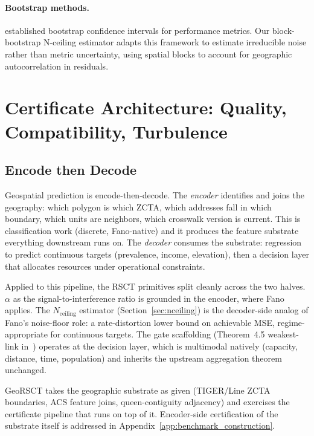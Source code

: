 \documentclass{article}
\begin{document}
\paragraph{Bootstrap methods.} \citet{efron1993bootstrap} established bootstrap confidence intervals for performance metrics. Our block-bootstrap N-ceiling estimator adapts this framework to estimate irreducible noise rather than metric uncertainty, using spatial blocks to account for geographic autocorrelation in residuals.

\section{Certificate Architecture: Quality, Compatibility, Turbulence}
\label{sec:rsn}

\subsection{Encode then Decode}

Geospatial prediction is encode-then-decode. The \emph{encoder} identifies and joins the geography: which polygon is which ZCTA, which addresses fall in which boundary, which units are neighbors, which crosswalk version is current. This is classification work (discrete, Fano-native) and it produces the feature substrate everything downstream runs on. The \emph{decoder} consumes the substrate: regression to predict continuous targets (prevalence, income, elevation), then a decision layer that allocates resources under operational constraints.

Applied to this pipeline, the RSCT primitives split cleanly across the two halves. $\alpha$ as the signal-to-interference ratio is grounded in the encoder, where Fano applies. The $N_{\text{ceiling}}$ estimator (Section~\ref{sec:nceiling}) is the decoder-side analog of Fano's noise-floor role: a rate-distortion lower bound on achievable MSE, regime-appropriate for continuous targets. The gate scaffolding (Theorem~4.5 weakest-link in~\citep{martin2026rsct}) operates at the decision layer, which is multimodal natively (capacity, distance, time, population) and inherits the upstream aggregation theorem unchanged.

GeoRSCT takes the geographic substrate as given (TIGER/Line ZCTA boundaries, ACS feature joins, queen-contiguity adjacency) and exercises the certificate pipeline that runs on top of it. Encoder-side certification of the substrate itself is addressed in Appendix~\ref{app:benchmark_construction}.
\end{document}

